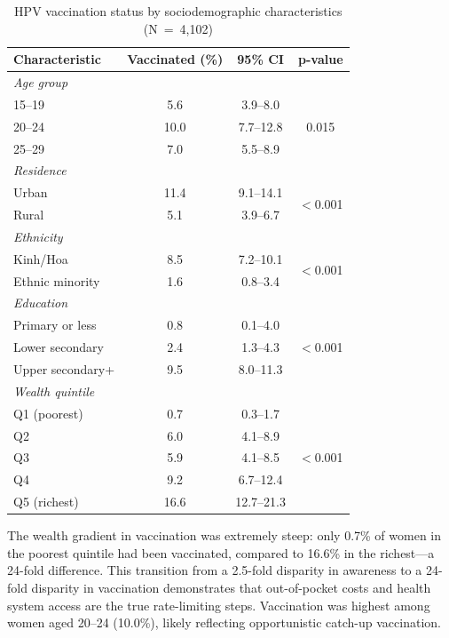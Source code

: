 \begin{table}[htbp]
\caption{HPV vaccination status by sociodemographic characteristics (N~=~4,102)}
\centering
\small
\begin{tabular}{|p{3.8cm}|c|c|c|}
\hline
\textbf{Characteristic} & \textbf{Vaccinated (\%)} & \textbf{95\% CI} & \textbf{p-value} \\
\hline
\multicolumn{4}{|l|}{\textit{Age group}} \\
\hline
15--19 & 5.6 & 3.9--8.0 & \multirow{3}{*}{0.015} \\
20--24 & 10.0 & 7.7--12.8 & \\
25--29 & 7.0 & 5.5--8.9 & \\
\hline
\multicolumn{4}{|l|}{\textit{Residence}} \\
\hline
Urban & 11.4 & 9.1--14.1 & \multirow{2}{*}{$<$0.001} \\
Rural & 5.1 & 3.9--6.7 & \\
\hline
\multicolumn{4}{|l|}{\textit{Ethnicity}} \\
\hline
Kinh/Hoa & 8.5 & 7.2--10.1 & \multirow{2}{*}{$<$0.001} \\
Ethnic minority & 1.6 & 0.8--3.4 & \\
\hline
\multicolumn{4}{|l|}{\textit{Education}} \\
\hline
Primary or less & 0.8 & 0.1--4.0 & \multirow{3}{*}{$<$0.001} \\
Lower secondary & 2.4 & 1.3--4.3 & \\
Upper secondary+ & 9.5 & 8.0--11.3 & \\
\hline
\multicolumn{4}{|l|}{\textit{Wealth quintile}} \\
\hline
Q1 (poorest) & 0.7 & 0.3--1.7 & \multirow{5}{*}{$<$0.001} \\
Q2 & 6.0 & 4.1--8.9 & \\
Q3 & 5.9 & 4.1--8.5 & \\
Q4 & 9.2 & 6.7--12.4 & \\
Q5 (richest) & 16.6 & 12.7--21.3 & \\
\hline
\end{tabular}
\label{tab:vaccination_bivariate}
\end{table}

The wealth gradient in vaccination was extremely steep: only 0.7\% of women in the poorest quintile had been vaccinated, compared to 16.6\% in the richest---a 24-fold difference. This transition from a 2.5-fold disparity in awareness to a 24-fold disparity in vaccination demonstrates that out-of-pocket costs and health system access are the true rate-limiting steps. Vaccination was highest among women aged 20--24 (10.0\%), likely reflecting opportunistic catch-up vaccination.

